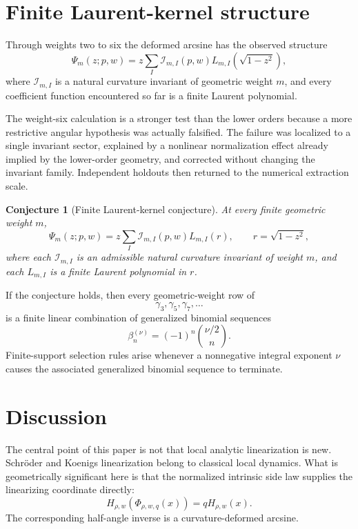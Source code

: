 \documentclass[11pt]{article}
\newtheorem{conjecture}[theorem]{Conjecture}
\theoremstyle{definition}
\theoremstyle{remark}
\newcommand{\cI}{\mathcal{I}}
\begin{document}
\section{Finite Laurent-kernel structure}
\label{sec:finite-laurent}

Through weights two to six the deformed arcsine has the observed structure
\[
\boxed{
\Psi_m(z;p,w)
=
z\sum_I\cI_{m,I}(p,w)
L_{m,I}\!\left(\sqrt{1-z^2}\right),
}
\]
where \(\cI_{m,I}\) is a natural curvature invariant of geometric weight
\(m\), and every coefficient function encountered so far is a finite Laurent
polynomial.

The weight-six calculation is a stronger test than the lower orders because
a more restrictive angular hypothesis was actually falsified.  The failure
was localized to a single invariant sector, explained by a nonlinear
normalization effect already implied by the lower-order geometry, and
corrected without changing the invariant family.  Independent holdouts then
returned to the numerical extraction scale.

\begin{conjecture}[Finite Laurent-kernel conjecture]
\label{conj:finite-laurent}
At every finite geometric weight \(m\),
\[
\boxed{
\Psi_m(z;p,w)
=
z\sum_I\cI_{m,I}(p,w)L_{m,I}(r),
\qquad r=\sqrt{1-z^2},
}
\]
where each \(\cI_{m,I}\) is an admissible natural curvature invariant of
weight \(m\), and each \(L_{m,I}\) is a finite Laurent polynomial in \(r\).
\end{conjecture}

If the conjecture holds, then every geometric-weight row of
\[
\gamma_3,\gamma_5,\gamma_7,\ldots
\]
is a finite linear combination of generalized binomial sequences
\[
\beta_n^{(\nu)}=(-1)^n\binom{\nu/2}{n}.
\]
Finite-support selection rules arise whenever a nonnegative integral exponent
\(\nu\) causes the associated generalized binomial sequence to terminate.

\section{Discussion}
\label{sec:discussion}

The central point of this paper is not that local analytic linearization is
new.  Schr\"oder and Koenigs linearization belong to classical local dynamics.
What is geometrically significant here is that the normalized intrinsic side
law supplies the linearizing coordinate directly:
\[
H_{\rho,w}(\Phi_{\rho,w,q}(x))=qH_{\rho,w}(x).
\]
The corresponding half-angle inverse is a curvature-deformed arcsine.
\end{document}
